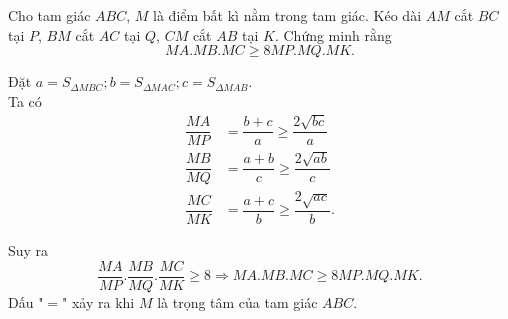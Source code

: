\begin{ex}%
    Cho tam giác $ABC$, $M$ là điểm bất kì nằm trong tam giác. Kéo dài $AM$ cắt $BC$ tại $P$, $BM$ cắt $AC$ tại $Q$, $CM$ cắt $AB$ tại $K$. Chứng minh rằng
    $$MA.MB.MC\ge 8MP.MQ.MK.$$
\loigiai
    {
    \immini
    {
	Đặt $a=S_{\Delta MBC}; b=S_{\Delta MAC}; c=S_{\Delta MAB}$.\\
	Ta có \\
	$$
	\begin{aligned}
	\dfrac{MA}{MP}&=\dfrac{b+c}{a}\ge \dfrac{2\sqrt{bc}}{a}\\
	\dfrac{MB}{MQ}&=\dfrac{a+b}{c}\ge \dfrac{2\sqrt{ab}}{c}\\
	\dfrac{MC}{MK}&=\dfrac{a+c}{b}\ge \dfrac{2\sqrt{ac}}{b}.
	\end{aligned}  
	$$ 

    }{
    }
	Suy ra \\
	$$\dfrac{MA}{MP}.\dfrac{MB}{MQ}.\dfrac{MC}{MK}\ge 8\Rightarrow MA.MB.MC\ge 8MP.MQ.MK.$$
	Dấu "$=$" xảy ra khi $M$ là trọng tâm của tam giác $ABC$.
    }
\end{ex}

